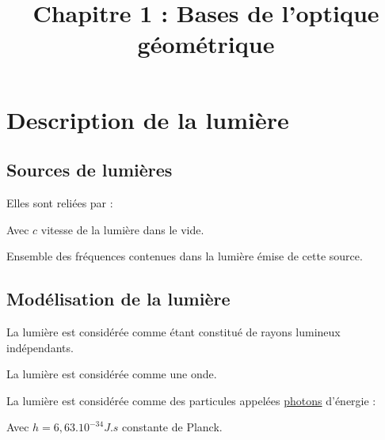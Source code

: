 \documentclass[11pt]{article}
\title{Chapitre 1 : Bases de l'optique géométrique}
\author{}
\date{}
\theoremstyle{cstyle}{\newtheorem{definition}{Définition}[section]}
\theoremstyle{cstyle}{\newtheorem{proposition}[definition]{Propriété}}
\theoremstyle{cstyle}{\newtheorem{theorem}[definition]{Théorème}}
\theoremstyle{mystyle}{\newtheorem{lemma}[definition]{Lemme}}
\theoremstyle{mystyle}{\newtheorem{corollary}[definition]{Corollaire}}
\theoremstyle{mystyle}{\newtheorem*{remark}{Remarque}}
\theoremstyle{mystyle}{\newtheorem*{remarks}{Remarques}}
\theoremstyle{mystyle}{\newtheorem*{example}{Exemple}}
\theoremstyle{mystyle}{\newtheorem*{examples}{Exemples}}
\theoremstyle{definition}{\newtheorem*{exercise}{Exercice}}
\theoremstyle{mystyle}{\newtheorem*{methode}{Méthode}}
\theoremstyle{cstyle}{\newtheorem*{cthm}{}}
\theoremstyle{warn}
\begin{document}
	
	\maketitle
	
	\begin{minipage}[t]{0.45\textwidth}
		\section{Description de la lumière}
		
		\subsection{Sources de lumières}
		
		\begin{proposition} Elles sont reliées par :
			
			Avec \(c\) vitesse de la lumière dans le vide.
		\end{proposition}
	
		\begin{definition}
			Ensemble des fréquences contenues dans la lumière émise de cette source.
		\end{definition}
	
		\subsection{Modélisation de la lumière}
		
		\begin{definition}
			La lumière est considérée comme étant constitué de rayons lumineux indépendants.
		\end{definition}
	
		\begin{definition}
			La lumière est considérée comme une onde.
		\end{definition}
	
		\begin{definition}
			La lumière est considérée comme des particules appelées \underline{photons} d'énergie : 
			
			Avec \(h = 6,63.10^{-34} J.s\) constante de Planck.
		\end{definition}
		
	\end{minipage}
	\hfill
\end{document}

